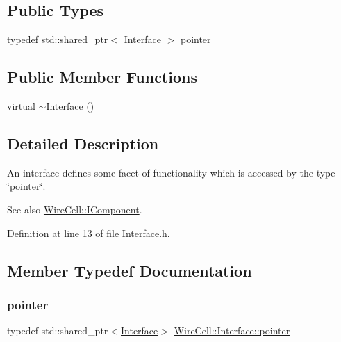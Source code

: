 \subsection*{Public Types}
\begin{DoxyCompactItemize}
\item 
typedef std\+::shared\+\_\+ptr$<$ \hyperlink{class_wire_cell_1_1_interface}{Interface} $>$ \hyperlink{class_wire_cell_1_1_interface_a09c548fb8266cfa39afb2e74a4615c37}{pointer}
\end{DoxyCompactItemize}
\subsection*{Public Member Functions}
\begin{DoxyCompactItemize}
\item 
virtual \hyperlink{class_wire_cell_1_1_interface_ae292f3fca9fbe492570f8992540b5d9f}{$\sim$\+Interface} ()
\end{DoxyCompactItemize}


\subsection{Detailed Description}
An interface defines some facet of functionality which is accessed by the type \char`\"{}pointer\char`\"{}.

See also \hyperlink{class_wire_cell_1_1_i_component}{Wire\+Cell\+::\+I\+Component}. 

Definition at line 13 of file Interface.\+h.



\subsection{Member Typedef Documentation}
\mbox{\label{class_wire_cell_1_1_interface_a09c548fb8266cfa39afb2e74a4615c37}} 
\subsubsection{\texorpdfstring{pointer}{pointer}}
{\footnotesize\ttfamily typedef std\+::shared\+\_\+ptr$<$\hyperlink{class_wire_cell_1_1_interface}{Interface}$>$ \hyperlink{class_wire_cell_1_1_interface_a09c548fb8266cfa39afb2e74a4615c37}{Wire\+Cell\+::\+Interface\+::pointer}}




